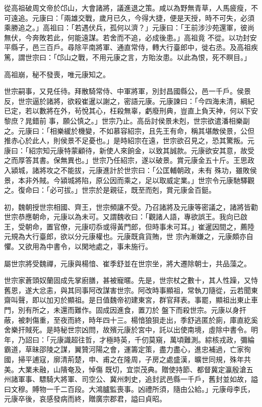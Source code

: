\begin{pinyinscope}
 從高祖破周文帝於邙山，大會諸將，議進退之策。咸以為野無青草，人馬疲瘦，不可遠追。元康曰：「兩雄交戰，歲月已久，今得大捷，便是天授，時不可失，必須乘勝追之。」高祖曰：「若遇伏兵，孤何以濟？」元康曰：「王前涉沙苑還軍，彼尚無伏，今奔敗若此，何能遠謀。若舍而不追，必成後患。」高祖竟
 不從。以功封安平縣子，邑三百戶。尋除平南將軍、通直常侍，轉大行臺郎中，徙右丞。及高祖疾篤，謂世宗曰：「邙山之戰，不用元康之言，方貽汝患。以此為恨，死不瞑目。」



 高祖崩，秘不發喪，唯元康知之。



 世宗嗣事，又見任待。拜散騎常侍、中軍將軍，別封昌國縣公，邑一千戶。侯景反，世宗逼於諸將，欲殺崔暹以謝之，密語元康。元康諫曰：「今四海未清，綱紀已定，若以數將在外，茍悅其心，枉殺無辜，虧廢刑典，豈直上負天神，何以下安黎庶？晁錯前
 事，願公慎之。」世宗乃止。高岳討侯景未剋，世宗欲遣潘相樂副之。元康曰：「相樂緩於機變，不如慕容紹宗，且先王有命，稱其堪敵侯景，公但推赤心於此人，則侯景不足憂也。」是時紹宗在遠，世宗欲召見之，恐其驚叛。元康曰：「紹宗知元康特蒙顧待，新使人來餉金，以致其誠款。元康欲安其意，故受之而厚答其書。保無異也。」世宗乃任紹宗，遂以破景。賞元康金五十斤。王思政入潁城，諸將攻之不能拔，元康進計於世宗曰：「公匡輔朝政，未有
 殊功，雖敗侯景，本非外賊。今潁城將陷，原公因而乘之，足以取威定業。」世宗令元康馳驛觀之。復命曰：「必可拔。」世宗於是親征，既至而剋，賞元康金百鋌。



 初，魏朝授世宗相國、齊王，世宗頻讓不受。乃召諸將及元康等密議之，諸將皆勸世宗恭應朝命，元康以為未可。又謂魏收曰：「觀諸人語，專欲誤王。我向已啟王，受朝命，置官僚，元康叨忝或得黃門郎，但時事未可耳。」崔暹因間之，薦陸元規為大行臺郎，欲以分元康權也。元康既貪貨賄，世
 宗內漸嫌之，元康頗亦自懼。又欲用為中書令，以閑地處之，事未施行。



 屬世宗將受魏禪，元康與楊愔、崔季舒並在世宗坐，將大遷除朝士，共品藻之。



 世宗家蒼頭奴蘭固成先掌廚膳，甚被寵暱。先是，世宗杖之數十，其人性躁，又恃舊恩，遂大忿恚，與其同事阿改謀害世宗。阿改時事顯祖，常執刀隨從，云若聞東齋叫聲，即以加刃於顯祖。是日值魏帝初建東宮，群官拜表。事罷，顯祖出東止車門，別有所之，未還而難作。固成因進食，置刀於
 盤下而殺世宗。元康以身扞蔽，被刺傷重，至夜而終，時年四十三。楊愔狼狽走出，季舒逃匿於廁，庫直紇奚舍樂扞賊死。是時秘世宗凶問，故殯元康於宮中，託以出使南境，虛除中書令。明年，乃詔曰：「元康識超往哲，才極時英，千仞莫窺，萬頃難測。綜核戎政，彌綸霸道，草昧邵陵之謀，翼贊河陽之會，運籌定策，盡力盡心，進忠補過，亡家徇國，掃平逋寇，廓清荊楚，申、甫之在隆周，子房之處盛漢，曠世同規，殊年共美。大業未融，山隤奄及，悼傷
 既切，宜崇茂典。贈使持節、都督冀定瀛殷滄五州諸軍事、驃騎大將軍、司空公、冀州刺史，追封武邑縣一千戶，舊封並如故，謚曰文穆。賻物一千二百段。大鴻臚監喪事。凶禮所須，隨由公給。」元康母李氏，元康卒後，哀感發病而終，贈廣宗郡君，謚曰貞昭。




\end{pinyinscope}
